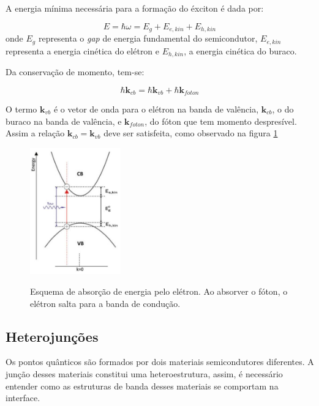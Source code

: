  		\par A energia mínima necessária para a formação do éxciton é dada por:

 		\begin{equation}
 			\label{bandas_1}
 			E = \hbar \omega = E_{g} + E_{e, kin} + E_{h, kin}
 		\end{equation}
 		onde $E_{g}$ representa o \textit{gap} de energia fundamental do semicondutor, $E_{e,kin}$ representa a energia cinética do elétron e $E_{h,kin}$, a energia cinética do buraco.

 		\par Da conservação de momento, tem-se:

 		\begin{equation}
 			\label{bandas_2}
 			\hbar \mathbf{k}_{cb} = \hbar \mathbf{k}_{vb} + \hbar \mathbf{k}_{foton}
 		\end{equation}

 		\par O termo $\mathbf{k}_{vb}$ é o vetor de onda para o elétron na banda de valência, $\mathbf{k}_{cb}$, o do buraco na banda de valência, e $\mathbf{k}_{foton}$, do fóton que tem momento despresível. Assim a relação $\mathbf{k}_{cb} = \mathbf{k}_{vb}$ deve ser satisfeita, como observado na figura \ref{fig8}

 		\begin{figure}[H]
	      \caption{Esquema de absorção de energia pelo elétron. Ao absorver o fóton, o elétron salta para a banda de condução.}
	      \centering
	      \includegraphics[width=0.35\textwidth]{images/figura8.jpg}
	      \label{fig8}
	    \end{figure}

\subsection{Heterojunções}

	\par Os pontos quânticos são formados por dois materiais semicondutores diferentes. A junção desses materiais constitui uma heteroestrutura, assim, é necessário entender como as estruturas de banda desses materiais se comportam na interface\cite{bulk2}.

